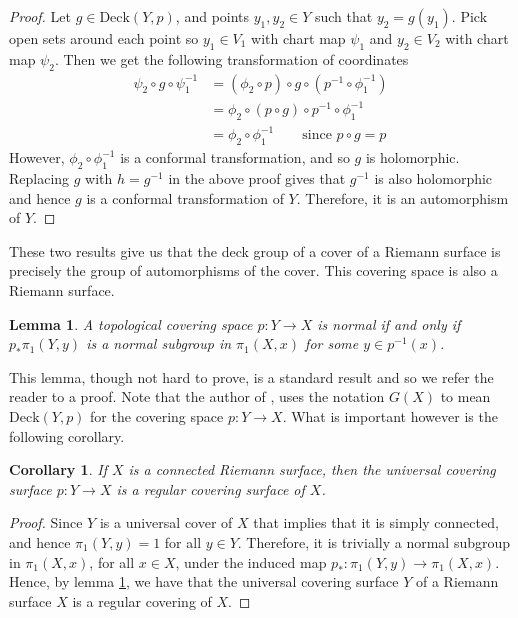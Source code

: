 \documentclass[11pt]{report}
\newtheorem{lemma}[thm]{Lemma}
\newtheorem{cor}[thm]{Corollary}
\theoremstyle{definition}
\begin{document}
\begin{proof}
  Let $g \in \text{Deck}(Y,p)$, and points $y_1,y_2 \in Y$ such that $y_2 = g(y_1)$. Pick open sets around each point so $y_1 \in V_1$ with chart map $\psi_1$ and $y_2 \in V_2$ with chart map $\psi_2$. Then we get the following transformation of coordinates
  \begin{align*}
    \psi_2\circ g \circ\psi_1^{-1} &= (\phi_2 \circ p) \circ g \circ (p^{-1}\circ \phi_1^{-1})\\
    &= \phi_2 \circ (p \circ g) \circ p^{-1}\circ \phi_1^{-1}\\
    &= \phi_2 \circ \phi_1^{-1} \qquad\text{since }p\circ g = p
  \end{align*}
  However, $\phi_2 \circ \phi_1^{-1}$ is a conformal transformation, and so $g$ is holomorphic. Replacing $g$ with $h = g^{-1}$ in the above proof gives that $g^{-1}$ is also holomorphic and hence $g$ is a conformal transformation of $Y$. Therefore, it is an automorphism of $Y$.
\end{proof}
These two results give us that the deck group of a cover of a Riemann surface is precisely the group of automorphisms of the cover. This covering space is also a Riemann surface.
\begin{lemma}\cite[Proposition 1.39]{Hatchers}\label{LemmaOnCoveringSurfaces}
  A topological covering space $p:Y \rightarrow X$ is normal if and only if $p_*\pi_1(Y,y)$ is a normal subgroup in $\pi_1(X,x)$ for some $y \in p^{-1}(x)$.
\end{lemma}
This lemma, though not hard to prove, is a standard result and so we refer the reader to a proof. Note that the author of \cite{Hatchers}, uses the notation $G(X)$ to mean $\text{Deck}(Y,p)$ for the covering space $p:Y \rightarrow X$. What is important however is the following corollary.
\begin{cor}
  If $X$ is a connected Riemann surface, then the universal covering surface $p:Y \rightarrow X$ is a regular covering surface of $X$.
\end{cor}
\begin{proof}
  Since $Y$ is a universal cover of $X$ that implies that it is simply connected, and hence $\pi_1(Y,y)=1$ for all $y\in Y$. Therefore, it is trivially a normal subgroup in $\pi_1(X,x)$, for all $x \in X$, under the induced map $p_*\colon \pi_1(Y,y) \rightarrow \pi_1(X,x)$. Hence, by lemma \ref{LemmaOnCoveringSurfaces}, we have that the universal covering surface $Y$ of a Riemann surface $X$ is a regular covering of $X$.
\end{proof}
\end{document}
